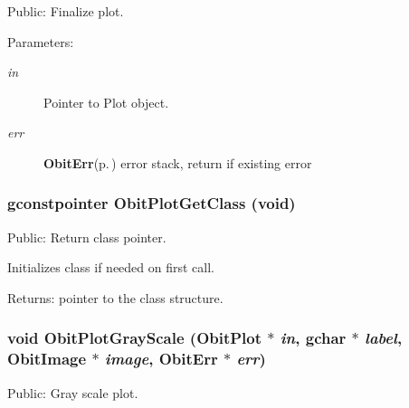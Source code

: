Public: Finalize plot. 

\begin{Desc}
\item[Parameters:]
\begin{description}
\item[{\em in}]Pointer to Plot object. \item[{\em err}]{\bf Obit\-Err}{\rm (p.\,\pageref{structObitErr})} error stack, return if existing error \end{description}
\end{Desc}
\subsubsection{\setlength{\rightskip}{0pt plus 5cm}gconstpointer Obit\-Plot\-Get\-Class (void)}\label{ObitPlot_8h_a8}


Public: Return class pointer. 

Initializes class if needed on first call. \begin{Desc}
\item[Returns:]pointer to the class structure. \end{Desc}
\subsubsection{\setlength{\rightskip}{0pt plus 5cm}void Obit\-Plot\-Gray\-Scale ({\bf Obit\-Plot} $\ast$ {\em in}, gchar $\ast$ {\em label}, {\bf Obit\-Image} $\ast$ {\em image}, {\bf Obit\-Err} $\ast$ {\em err})}\label{ObitPlot_8h_a13}


Public: Gray scale plot. 

